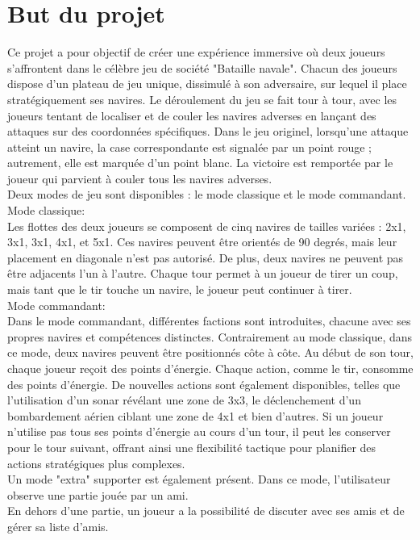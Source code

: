 \documentclass[../introduction.tex]{subfiles}
\begin{document}
\section{But du projet}
Ce projet a pour objectif de créer une expérience immersive où deux joueurs s'affrontent dans le célèbre jeu de société "Bataille navale".
Chacun des joueurs dispose d'un plateau de jeu unique, dissimulé à son adversaire, sur lequel il place stratégiquement ses navires. 
Le déroulement du jeu se fait tour à tour, avec les joueurs tentant de localiser et de couler les navires adverses en lançant des attaques sur des coordonnées spécifiques.
Dans le jeu originel, lorsqu'une attaque atteint un navire, la case correspondante est signalée par un point rouge ; autrement, elle est marquée d'un point blanc.
La victoire est remportée par le joueur qui parvient à couler tous les navires adverses.\\

Deux modes de jeu sont disponibles : le mode classique et le mode commandant.\\

Mode classique:\\
Les flottes des deux joueurs se composent de cinq navires de tailles variées : 2x1, 3x1, 3x1, 4x1, et 5x1. 
Ces navires peuvent être orientés de 90 degrés, mais leur placement en diagonale n'est pas autorisé. 
De plus, deux navires ne peuvent pas être adjacents l'un à l'autre. 
Chaque tour permet à un joueur de tirer un coup, mais tant que le tir touche un navire, le joueur peut continuer à tirer.\\

Mode commandant:\\
Dans le mode commandant, différentes factions sont introduites, chacune avec ses propres navires et compétences distinctes. 
Contrairement au mode classique, dans ce mode, deux navires peuvent être positionnés côte à côte. 
Au début de son tour, chaque joueur reçoit des points d'énergie. 
Chaque action, comme le tir, consomme des points d'énergie. 
De nouvelles actions sont également disponibles, telles que l'utilisation d'un sonar révélant une zone de 3x3, 
le déclenchement d'un bombardement aérien ciblant une zone de 4x1 et bien d'autres.
Si un joueur n'utilise pas tous ses points d'énergie au cours d'un tour, il peut les conserver pour le tour suivant, offrant ainsi une flexibilité tactique pour planifier des actions stratégiques plus complexes.\\

Un mode "extra" supporter est également présent. Dans ce mode, l'utilisateur observe une partie jouée par un ami.\\

En dehors d'une partie, un joueur a la possibilité de discuter avec ses amis et de gérer sa liste d'amis.
\end{document}
